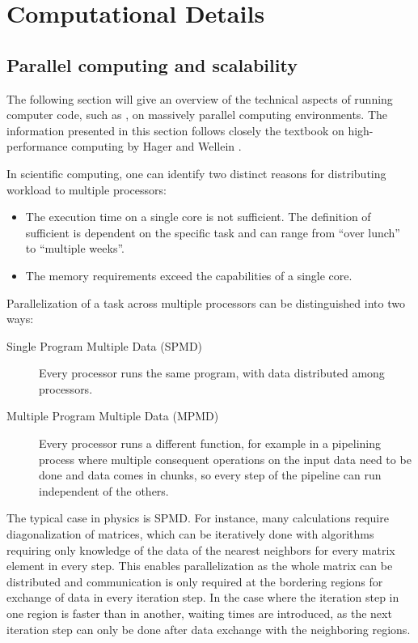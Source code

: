 \documentclass[main.tex]{subfiles}
\begin{document}
\chapter{Computational Details\label{ch:computation}}

\section{Parallel computing and scalability\label{sec:parallel_computing}}

The following section will give an overview of the technical aspects of running computer code, such as \QE, on massively parallel computing environments.
The information presented in this section follows closely the textbook on high-performance computing by Hager and Wellein \cite{hager_introduction_2010}.

In scientific computing, one can identify two distinct reasons for distributing workload to multiple processors:
\begin{itemize}
    \item The execution time on a single core is not sufficient. The definition of sufficient is dependent on the specific task and can range from \enquote{over lunch} to \enquote{multiple weeks}.
    \item The memory requirements exceed the capabilities of a single core.
\end{itemize}

Parallelization of a task across multiple processors can be distinguished into two ways:
\begin{description}
    \item[Single Program Multiple Data (SPMD)] Every processor runs the same program, with data distributed among processors.
    \item[Multiple Program Multiple Data (MPMD)] Every processor runs a different function, for example in a pipelining process where multiple consequent operations on the input data need to be done and data comes in chunks, so every step of the pipeline can run independent of the others.
\end{description}
The typical case in physics is SPMD.
For instance, many calculations require diagonalization of matrices, which can be iteratively done with algorithms requiring only knowledge of the data of the nearest neighbors for every matrix element in every step.
This enables parallelization as the whole matrix can be distributed and communication is only required at the bordering regions for exchange of data in every iteration step.
In the case where the iteration step in one region is faster than in another, waiting times are introduced, as the next iteration step can only be done after data exchange with the neighboring regions.
\end{document}
